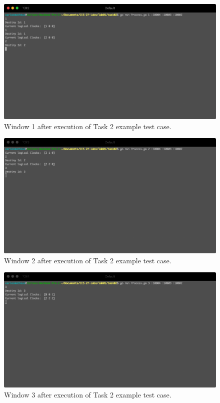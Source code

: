 \documentclass[a4paper, 11pt]{article}
\begin{document}
\begin{figure}[h]
  \begin{center}
  \includegraphics[width=4.5in]{./imgs/task2_example_window1.png}
  \caption{Window 1 after execution of Task 2 example test case.}
  \label{img_task2_example_window1}
  \end{center}
\end{figure}

\begin{figure}[h]
  \begin{center}
  \includegraphics[width=4.5in]{./imgs/task2_example_window2.png}
  \caption{Window 2 after execution of Task 2 example test case.}
  \label{img_task2_example_window2}
  \end{center}
\end{figure}

\begin{figure}[h]
  \begin{center}
  \includegraphics[width=4.5in]{./imgs/task2_example_window3.png}
  \caption{Window 3 after execution of Task 2 example test case.}
  \label{img_task2_example_window3}
  \end{center}
\end{figure}
\end{document}
